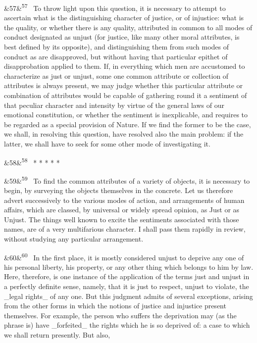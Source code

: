 \documentclass[12pt]{article}
\newcommand{\para}[1][]{\par\noindent\ifx&#1&\else\textsuperscript{\footnotesize #1}~\fi}
\begin{document}
\para[57] To throw light upon this question, it is necessary to attempt to ascertain what is the distinguishing character of justice, or of injustice: what is the quality, or whether there is any quality, attributed in common to all modes of conduct designated as unjust (for justice, like many other moral attributes, is best defined by its opposite), and distinguishing them from such modes of conduct as are disapproved, but without having that particular epithet of disapprobation applied to them. If, in everything which men are accustomed to characterize as just or unjust, some one common attribute or collection of attributes is always present, we may judge whether this particular attribute or combination of attributes would be capable of gathering round it a sentiment of that peculiar character and intensity by virtue of the general laws of our emotional constitution, or whether the sentiment is inexplicable, and requires to be regarded as a special provision of Nature. If we find the former to be the case, we shall, in resolving this question, have resolved also the main problem: if the latter, we shall have to seek for some other mode of investigating it.

\para[58] * * * * *

\para[59] To find the common attributes of a variety of objects, it is necessary to begin, by surveying the objects themselves in the concrete. Let us therefore advert successively to the various modes of action, and arrangements of human affairs, which are classed, by universal or widely spread opinion, as Just or as Unjust. The things well known to excite the sentiments associated with those names, are of a very multifarious character. I shall pass them rapidly in review, without studying any particular arrangement.

\para[60] In the first place, it is mostly considered unjust to deprive any one of his personal liberty, his property, or any other thing which belongs to him by law. Here, therefore, is one instance of the application of the terms just and unjust in a perfectly definite sense, namely, that it is just to respect, unjust to violate, the \_legal rights\_ of any one. But this judgment admits of several exceptions, arising from the other forms in which the notions of justice and injustice present themselves. For example, the person who suffers the deprivation may (as the phrase is) have \_forfeited\_ the rights which he is so deprived of: a case to which we shall return presently. But also,
\end{document}
